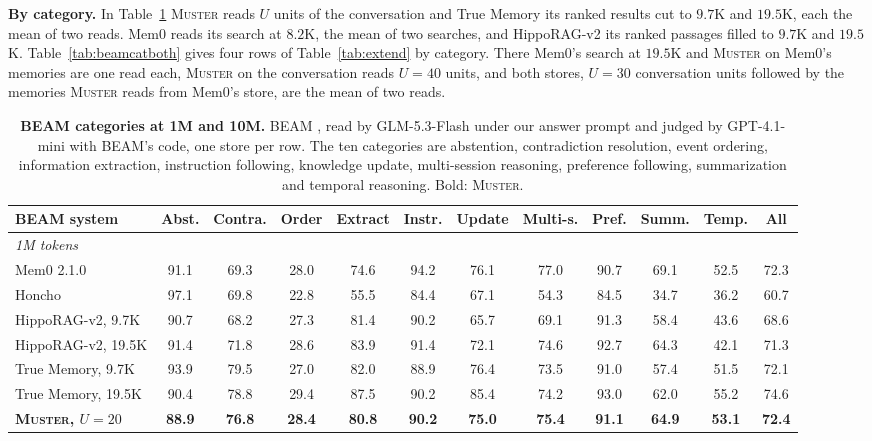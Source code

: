 \documentclass{article}
\newcommand{\ours}{\rowcolor{oursbg}}
\newcommand{\tabfont}{\fontsize{7.5}{8.5}\selectfont\renewcommand{\arraystretch}{1.0}}
\newcommand{\sys}{\textsc{Muster}}
\begin{document}
\textbf{By category.} In Table~\ref{tab:beamcatall} \sys{} reads $U$ units of the conversation and True Memory its ranked results cut to $9.7$K and $19.5$K, each the mean of two reads. Mem0 reads its search at $8.2$K, the mean of two searches, and HippoRAG-v2 its ranked passages filled to $9.7$K and $19.5$K. Table~\ref{tab:beamcatboth} gives four rows of Table~\ref{tab:extend} by category. There Mem0's search at $19.5$K and \sys{} on Mem0's memories are one read each, \sys{} on the conversation reads $U{=}40$ units, and both stores, $U{=}30$ conversation units followed by the memories \sys{} reads from Mem0's store, are the mean of two reads.


\begin{table}[H]
\centering\tabfont
\caption{\textbf{BEAM categories at 1M and 10M.} BEAM \cite{beam}, read by GLM-5.3-Flash \cite{glm5} under our answer prompt and judged by GPT-4.1-mini with BEAM's code, one store per row. The ten categories are abstention, contradiction resolution, event ordering, information extraction, instruction following, knowledge update, multi-session reasoning, preference following, summarization and temporal reasoning. Bold: \sys{}.}
\label{tab:beamcatall}
\setlength{\tabcolsep}{3.4pt}
\begin{tabular}{lccccccccccc}
\toprule
BEAM system & Abst. & Contra. & Order & Extract & Instr. & Update & Multi-s. & Pref. & Summ. & Temp. & All \\
\midrule
\multicolumn{12}{l}{\emph{1M tokens}}\\
Mem0 2.1.0 & 91.1 & 69.3 & 28.0 & 74.6 & 94.2 & 76.1 & 77.0 & 90.7 & 69.1 & 52.5 & 72.3 \\
Honcho & 97.1 & 69.8 & 22.8 & 55.5 & 84.4 & 67.1 & 54.3 & 84.5 & 34.7 & 36.2 & 60.7 \\
HippoRAG-v2, 9.7K & 90.7 & 68.2 & 27.3 & 81.4 & 90.2 & 65.7 & 69.1 & 91.3 & 58.4 & 43.6 & 68.6 \\
HippoRAG-v2, 19.5K & 91.4 & 71.8 & 28.6 & 83.9 & 91.4 & 72.1 & 74.6 & 92.7 & 64.3 & 42.1 & 71.3 \\
True Memory, 9.7K & 93.9 & 79.5 & 27.0 & 82.0 & 88.9 & 76.4 & 73.5 & 91.0 & 57.4 & 51.5 & 72.1 \\
True Memory, 19.5K & 90.4 & 78.8 & 29.4 & 87.5 & 90.2 & 85.4 & 74.2 & 93.0 & 62.0 & 55.2 & 74.6 \\
\ours \textbf{\sys{}, $U{=}20$} & \textbf{88.9} & \textbf{76.8} & \textbf{28.4} & \textbf{80.8} & \textbf{90.2} & \textbf{75.0} & \textbf{75.4} & \textbf{91.1} & \textbf{64.9} & \textbf{53.1} & \textbf{72.4} \\

\end{tabular}
\end{table}
\end{document}
